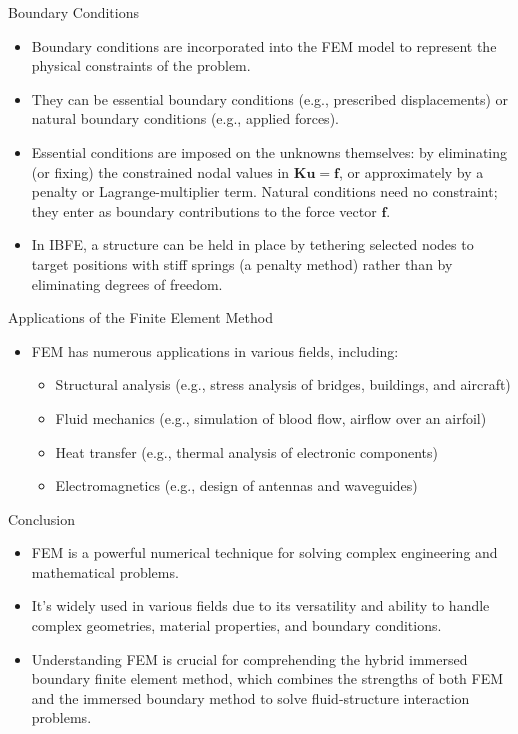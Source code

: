 \documentclass[aspectratio=169,11pt]{beamer}
\begin{document}
\begin{frame}{Boundary Conditions}
    \begin{itemize}
        \item Boundary conditions are incorporated into the FEM model to represent the physical constraints of the problem.
        \item They can be essential boundary conditions (e.g., prescribed displacements) or natural boundary conditions (e.g., applied forces).
        \item Essential conditions are imposed on the unknowns themselves: by eliminating (or fixing) the constrained nodal values in $\mathbf{K}\mathbf{u}=\mathbf{f}$, or approximately by a penalty or Lagrange-multiplier term. Natural conditions need no constraint; they enter as boundary contributions to the force vector $\mathbf{f}$.
        \item In IBFE, a structure can be held in place by tethering selected nodes to target positions with stiff springs (a penalty method) rather than by eliminating degrees of freedom.
    \end{itemize}
\end{frame}

\begin{frame}{Applications of the Finite Element Method}
    \begin{itemize}
        \item FEM has numerous applications in various fields, including:
        \begin{itemize}
            \item Structural analysis (e.g., stress analysis of bridges, buildings, and aircraft)
            \item Fluid mechanics (e.g., simulation of blood flow, airflow over an airfoil)
            \item Heat transfer (e.g., thermal analysis of electronic components)
            \item Electromagnetics (e.g., design of antennas and waveguides)
        \end{itemize}
    \end{itemize}
\end{frame}

\begin{frame}{Conclusion}
    \begin{itemize}
        \item FEM is a powerful numerical technique for solving complex engineering and mathematical problems.
        \item It's widely used in various fields due to its versatility and ability to handle complex geometries, material properties, and boundary conditions.
        \item Understanding FEM is crucial for comprehending the hybrid immersed boundary finite element method, which combines the strengths of both FEM and the immersed boundary method to solve fluid-structure interaction problems.
    \end{itemize}
\end{frame}
\end{document}
